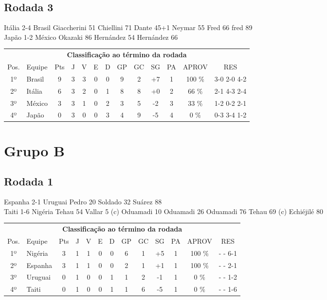 \documentclass{article}
\begin{document}
\subsection*{Rodada 3}
Itália 2-4 Brasil
Giaccherini 51
Chiellini 71
Dante 45+1
Neymar 55
Fred 66
fred 89
\\
Japão 1-2 México
Okazaki 86
Hernández 54
Hernández 66
\\
\begin{center}
\begin{tabular}{| c | l | c | c | c | c | c | c | c | c | c | c | c |}
\multicolumn{13}{c}{\textbf{Classificação ao término da rodada}}\\
Pos.&Equipe&Pts&J&V&E&D&GP&GC&SG&PA&APROV&RES\\
1º&Brasil              &9&3	&3&0&0	&9&2&+7	&1&100 \%	&3-0 2-0 4-2 \\
2º&Itália              &6&3	&2&0&1	&8&8&+0	&2& 66 \%	&2-1 4-3 2-4 \\
3º&México              &3&3	&1&0&2	&3&5&-2	&3& 33 \%	&1-2 0-2 2-1 \\
4º&Japão               &0&3	&0&0&3	&4&9&-5	&4&  0 \%	&0-3 3-4 1-2 \\
\end{tabular}
\end{center}


\section*{Grupo B}
\subsection*{Rodada 1}
Espanha 2-1 Uruguai
Pedro 20
Soldado 32
Suárez 88
\\
Taiti 1-6 Nigéria
Tehau 54
Vallar 5 (c)
Oduamadi 10
Oduamadi 26
Oduamadi 76
Tehau 69 (c)
Echiéjilé 80
\\
\begin{center}
\begin{tabular}{| c | l | c | c | c | c | c | c | c | c | c | c | c |}
\multicolumn{13}{c}{\textbf{Classificação ao término da rodada}}\\
Pos.&Equipe&Pts&J&V&E&D&GP&GC&SG&PA&APROV&RES\\
1º&Nigéria             &3&1	&1&0&0	&6&1&+5	&1&100 \%	& -  - 6-1 \\
2º&Espanha             &3&1	&1&0&0	&2&1&+1	&1&100 \%	& -  - 2-1 \\
3º&Uruguai             &0&1	&0&0&1	&1&2&-1	&1&  0 \%	& -  - 1-2 \\
4º&Taiti               &0&1	&0&0&1	&1&6&-5	&1&  0 \%	& -  - 1-6 \\
\end{tabular}
\end{center}
\end{document}
